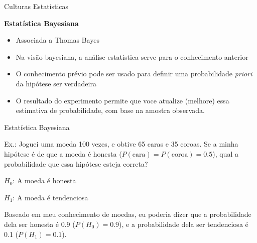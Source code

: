\documentclass{beamer}\usepackage[]{graphicx}\usepackage[]{color}
\begin{document}
\begin{frame}{Culturas Estatísticas}

\textbf{Estatística Bayesiana}

\begin{itemize}

  \item Associada a Thomas Bayes

 \item Na visão bayesiana, a análise estatística serve para  o conhecimento anterior

 \item O conhecimento prévio pode ser usado para definir uma probabilidade \emph{priori} da hipótese ser verdadeira 
 
 \item O resultado do experimento permite que voce atualize (melhore) essa estimativa de probabilidade, com base na amostra observada.

\end{itemize}

\end{frame}


\begin{frame}{Estatística Bayesiana}

\alert{Ex.:} Joguei uma moeda 100 vezes, e obtive 65 caras e 35 coroas. Se a minha hipótese é de que a moeda é honesta ($P(\text{cara}) = P(\text{coroa}) = 0.5$), qual a probabilidade que essa hipótese esteja correta?
\vfill

$H_0$: A moeda é honesta

$H_1$: A moeda é tendenciosa

\vfill
Baseado em meu conhecimento de moedas, eu poderia dizer que a probabilidade dela ser honesta é 0.9 ($P(H_0) = 0.9$), e a probabilidade dela ser tendenciosa é 0.1 ($P(H_1) = 0.1$). 
 
\end{frame}
\end{document}
